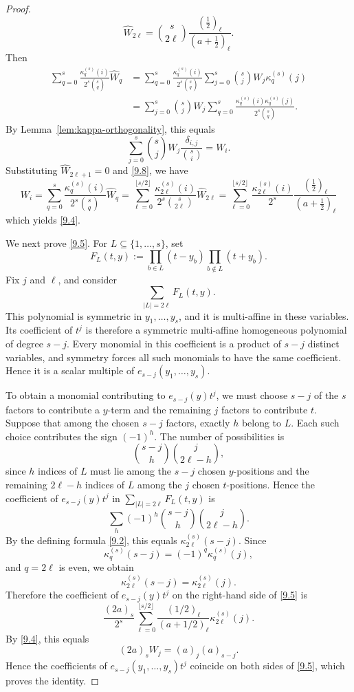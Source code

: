 \documentclass[10pt,a4paper]{amsart}
\theoremstyle{definition}
\begin{document}
\begin{proof}
\begin{equation}\label{9.8}
\widehat W_{2\ell}
=
\binom{s}{2\ell}
\frac{(\frac12)_\ell}
     {(a+\frac12)_\ell}.
\end{equation}
Then
\[
\begin{aligned}   
\sum_{q=0}^s
\frac{\kappa_q^{(s)}(i)}{2^s\binom{s}{q}}
\widehat W_q
&=
\sum_{q=0}^s
\frac{\kappa_q^{(s)}(i)}{2^s\binom{s}{q}}
\sum_{j=0}^s\binom{s}{j}W_j\kappa_q^{(s)}(j)\\
&=
\sum_{j=0}^s
\binom{s}{j}W_j
\sum_{q=0}^s
\frac{\kappa_q^{(s)}(i)\kappa_q^{(s)}(j)}{2^s\binom{s}{q} }.
\end{aligned}
\]
By Lemma~\ref{lem:kappa-orthogonality},
this equals 
\[
\sum_{j=0}^s
\binom{s}{j}W_j
\frac{\delta_{i,j}}{\binom{s}{i}}=W_i .
\]
Substituting $\widehat W_{2\ell +1} =0$ and  \eqref{9.8},
we have
\[
W_i 
= 
\sum_{q=0}^s
\frac{\kappa_q^{(s)}(i)}{2^s\binom{s}{q}}
\widehat W_q
=
\sum_{\ell=0}^{\lfloor s/2\rfloor}
\frac{\kappa_{2\ell}^{(s)}(i)}{2^s\binom{s}{2\ell}}
\widehat W_{2\ell}
=
\sum_{\ell=0}^{\lfloor s/2\rfloor}
\frac{\kappa_{2\ell}^{(s)}(i)}{2^s}
\frac{(\frac12)_\ell}
     {(a+\frac12)_\ell}
\]
which yields \eqref{9.4}.

We next prove \eqref{9.5}. 
For $L\subseteq\{1,\ldots,s\}$,
set
\[
F_L(t,y)
:=
\prod_{b\in L}(t-y_b)
\prod_{b\notin L}(t+y_b).
\]
Fix \(j\) and \(\ell\), and consider
\[
\sum_{|L|=2\ell}F_L(t,y).
\]
This polynomial is symmetric in \(y_1,\ldots,y_s\), and it is multi-affine in these variables. Its coefficient of \(t^j\) is therefore a symmetric multi-affine homogeneous polynomial of degree \(s-j\). Every monomial in this coefficient is a product of \(s-j\) distinct variables, and symmetry forces all such monomials to have the same coefficient. Hence it is a scalar multiple of \(e_{s-j}(y_1,\ldots,y_s)\).

To obtain a monomial contributing to
\(e_{s-j}(y)t^j\), we must choose \(s-j\) of the
\(s\) factors to contribute a \(y\)-term and the
remaining \(j\) factors to contribute \(t\).
Suppose that among the chosen \(s-j\) factors,
exactly \(h\) belong to \(L\).
Each such choice contributes the sign \((-1)^h\).
The number of possibilities is
\[
\binom{s-j}{h}\binom{j}{2\ell-h},
\]
since \(h\) indices of \(L\) must lie among the
\(s-j\) chosen \(y\)-positions and the remaining
\(2\ell-h\) indices of \(L\) among the \(j\)
chosen \(t\)-positions.
Hence the coefficient of
\(e_{s-j}(y)t^j\) in
$\sum_{|L|=2\ell}F_L(t,y)$
is
\[
\sum_h
(-1)^h
\binom{s-j}{h}
\binom{j}{2\ell-h}.
\]
By the defining formula \eqref{9.2}, this equals
$\kappa_{2\ell}^{(s)}(s-j)$.
Since
\[
\kappa_q^{(s)}(s-j)
=
(-1)^q\kappa_q^{(s)}(j),
\]
and \(q=2\ell\) is even, we obtain
\[
\kappa_{2\ell}^{(s)}(s-j)
=
\kappa_{2\ell}^{(s)}(j).
\]
Therefore the coefficient of
\(e_{s-j}(y)t^j\) on the right-hand side of
\eqref{9.5} is
\[
\frac{(2a)_s}{2^s}
\sum_{\ell=0}^{\lfloor s/2\rfloor}
\frac{(1/2)_\ell}{(a+1/2)_\ell}
\kappa_{2\ell}^{(s)}(j).
\]
By \eqref{9.4}, this equals
\[
(2a)_sW_j
=
(a)_j(a)_{s-j}.
\]
Hence the coefficients of
\(e_{s-j}(y_1,\ldots,y_s)t^j\)
coincide on both sides of \eqref{9.5}, which proves
the identity.
\end{proof}
\end{document}
